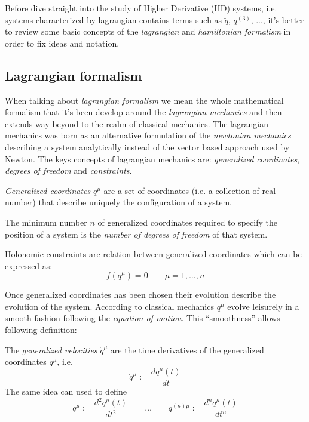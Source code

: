 Before dive straight into the study of Higher Derivative (HD) systems, i.e. systems
characterized by lagrangian contains terms such as $\ddot{q}$, ${q}^{(3)}$, ..., it's
better to review some basic concepts of the \emph{lagrangian} and \emph{hamiltonian
formalism} in order to fix ideas and notation.

\subsection{Lagrangian formalism}
When talking about \emph{lagrangian formalism} we mean the whole mathematical formalism
that it's been develop around the \emph{lagrangian mechanics} and then extends way
beyond to the realm of classical mechanics. The lagrangian mechanics was born as an
alternative formulation of the \emph{newtonian mechanics} describing a system
analytically instead of the vector based approach used by Newton. The keys concepts of
lagrangian mechanics are: \emph{generalized coordinates}, \emph{degrees of freedom} and
\emph{constraints}.
\begin{definition} \cite{Ginsberg08}
    \emph{Generalized coordinates} $q^{\mu}$ are a set of coordinates (i.e. a
    collection of real number) that describe uniquely the configuration of a system.
\end{definition}
\begin{definition} \cite{Ginsberg08}
    The minimum number $n$ of generalized coordinates required to specify the position
    of a system is the \emph{number of degrees of freedom} of that system.
\end{definition}
\begin{definition} \cite{Goldstein11_hol_constraints}
    Holonomic constraints are relation between generalized coordinates which can be
    expressed as:
    \begin{equation*}
        f(q^{\mu}) = 0 \qquad \mu = 1, \ldots, n
    \end{equation*}
\end{definition}
Once generalized coordinates has been chosen their evolution describe the evolution
of the system. According to classical mechanics $q^{\mu}$ evolve leisurely in a smooth
fashion following the \emph{equation of motion}. This ``smoothness'' allows following
definition:
\begin{definition}
    The \emph{generalized velocities} $\dot{q}^{\mu}$ are the time derivatives of the
    generalized coordinates $q^{\mu}$, i.e.
    \begin{equation*}
      \dot{q}^{\mu} := \frac{dq^{\mu}(t)}{dt}
    \end{equation*}
    The same idea can used to define
    \begin{equation*}
        \ddot{q}^{\mu} := \frac{d^2q^{\mu}(t)}{dt^2} \qquad \ldots \qquad
        q^{(n)\mu} := \frac{d^nq^{\mu}(t)}{dt^n}
    \end{equation*}
\end{definition}

